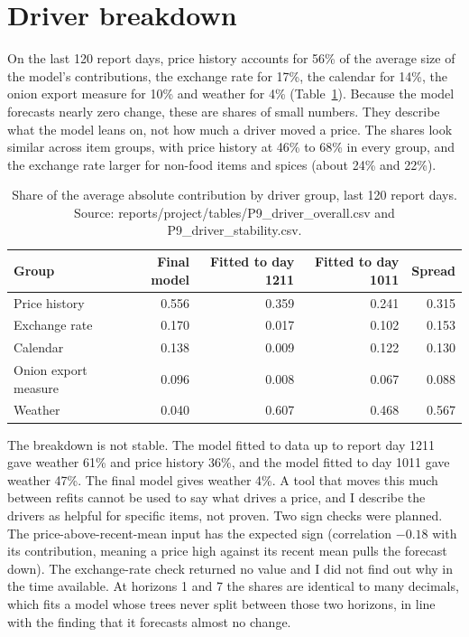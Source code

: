 \documentclass[12pt]{report}
\begin{document}
\section{Driver breakdown}
On the last 120 report days, price history accounts for 56\% of the average size of the model's contributions, the exchange rate for 17\%, the calendar for 14\%, the onion export measure for 10\% and weather for 4\% (Table~\ref{tab:drivers}). Because the model forecasts nearly zero change, these are shares of small numbers. They describe what the model leans on, not how much a driver moved a price. The shares look similar across item groups, with price history at 46\% to 68\% in every group, and the exchange rate larger for non-food items and spices (about 24\% and 22\%).

\begin{table}[H]\centering\small
\caption{Share of the average absolute contribution by driver group, last 120 report days. Source: reports/project/tables/P9\_driver\_overall.csv and P9\_driver\_stability.csv.}\label{tab:drivers}
\begin{tabular}{lrrrr}
\toprule
Group & Final model & Fitted to day 1211 & Fitted to day 1011 & Spread \\
\midrule
Price history & 0.556 & 0.359 & 0.241 & 0.315 \\
Exchange rate & 0.170 & 0.017 & 0.102 & 0.153 \\
Calendar & 0.138 & 0.009 & 0.122 & 0.130 \\
Onion export measure & 0.096 & 0.008 & 0.067 & 0.088 \\
Weather & 0.040 & 0.607 & 0.468 & 0.567 \\
\bottomrule
\end{tabular}
\end{table}

The breakdown is not stable. The model fitted to data up to report day 1211 gave weather 61\% and price history 36\%, and the model fitted to day 1011 gave weather 47\%. The final model gives weather 4\%. A tool that moves this much between refits cannot be used to say what drives a price, and I describe the drivers as helpful for specific items, not proven. Two sign checks were planned. The price-above-recent-mean input has the expected sign (correlation $-0.18$ with its contribution, meaning a price high against its recent mean pulls the forecast down). The exchange-rate check returned no value and I did not find out why in the time available. At horizons 1 and 7 the shares are identical to many decimals, which fits a model whose trees never split between those two horizons, in line with the finding that it forecasts almost no change.
\end{document}
